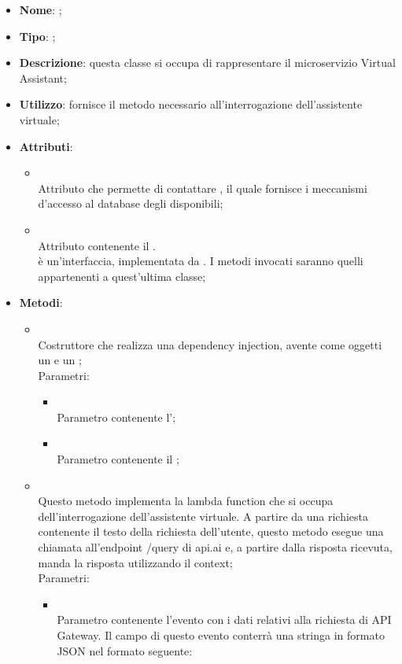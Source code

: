 \begin{itemize}
	\item \textbf{Nome}: ;
	\item \textbf{Tipo}: ;
	\item \textbf{Descrizione}: questa classe si occupa di rappresentare il microservizio Virtual Assistant;
	\item \textbf{Utilizzo}: fornisce il metodo necessario all'interrogazione dell'assistente virtuale;
	\item \textbf{Attributi}:
	\begin{itemize}
		\item[]  \\
		Attributo che permette di contattare , il quale fornisce i meccanismi d'accesso al database degli  disponibili;
		\item[]  \\
		Attributo contenente il . \\
 è un'interfaccia, implementata da .  I metodi invocati saranno quelli appartenenti a quest'ultima classe;
	\end{itemize}
	\item \textbf{Metodi}:
	\begin{itemize}
		\item[]  \\
		Costruttore che realizza una dependency injection, avente come oggetti un  e un ;\\
		Parametri:
		\begin{itemize}
			\item {} \\
			Parametro contenente l';
			\item {} \\
			Parametro contenente il ;
		\end{itemize}
		\item[]  \\
		Questo metodo implementa la lambda function che si occupa dell'interrogazione dell'assistente virtuale. A partire da una richiesta contenente il testo della richiesta dell'utente, questo metodo esegue una chiamata all'endpoint /query di api.ai e, a partire dalla risposta ricevuta, manda la risposta utilizzando il context;\\
		Parametri:
		\begin{itemize}
			\item {} \\
			Parametro contenente l'evento con i dati relativi alla richiesta di API Gateway. Il campo  di questo evento conterrà una stringa in formato JSON nel formato seguente:


\end{itemize}
\end{itemize}
\end{itemize}
